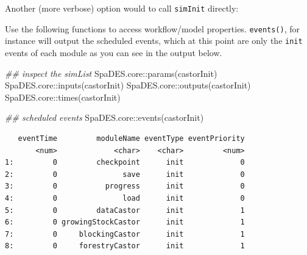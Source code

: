\documentclass[
  letterpaper,
  DIV=11,
  numbers=noendperiod]{scrreprt}
\newenvironment{Shaded}{\begin{snugshade}}{\end{snugshade}}
\newcommand{\AttributeTok}[1]{\textcolor[rgb]{0.40,0.45,0.13}{#1}}
\newcommand{\DocumentationTok}[1]{\textcolor[rgb]{0.37,0.37,0.37}{\textit{#1}}}
\newcommand{\FunctionTok}[1]{\textcolor[rgb]{0.28,0.35,0.67}{#1}}
\newcommand{\NormalTok}[1]{\textcolor[rgb]{0.00,0.23,0.31}{#1}}
\newcommand{\OtherTok}[1]{\textcolor[rgb]{0.00,0.23,0.31}{#1}}
\newcommand{\SpecialCharTok}[1]{\textcolor[rgb]{0.37,0.37,0.37}{#1}}
\begin{document}
Another (more verbose) option would to call \texttt{simInit} directly:

\begin{Shaded}
\end{Shaded}

Use the following functions to access workflow/model properties.
\texttt{events()}, for instance will output the scheduled events, which
at this point are only the \texttt{init} events of each module as you
can see in the output below.

\begin{Shaded}
\begin{Highlighting}[]
\DocumentationTok{\#\# inspect the \textasciigrave{}simList\textasciigrave{}}
\NormalTok{SpaDES.core}\SpecialCharTok{::}\FunctionTok{params}\NormalTok{(castorInit) }
\NormalTok{SpaDES.core}\SpecialCharTok{::}\FunctionTok{inputs}\NormalTok{(castorInit)}
\NormalTok{SpaDES.core}\SpecialCharTok{::}\FunctionTok{outputs}\NormalTok{(castorInit)}
\NormalTok{SpaDES.core}\SpecialCharTok{::}\FunctionTok{times}\NormalTok{(castorInit) }

\DocumentationTok{\#\# scheduled events}
\NormalTok{SpaDES.core}\SpecialCharTok{::}\FunctionTok{events}\NormalTok{(castorInit) }
\end{Highlighting}
\end{Shaded}

\begin{verbatim}
   eventTime         moduleName eventType eventPriority
       <num>             <char>    <char>         <num>
1:         0         checkpoint      init             0
2:         0               save      init             0
3:         0           progress      init             0
4:         0               load      init             0
5:         0         dataCastor      init             1
6:         0 growingStockCastor      init             1
7:         0     blockingCastor      init             1
8:         0     forestryCastor      init             1
\end{verbatim}
\end{document}
